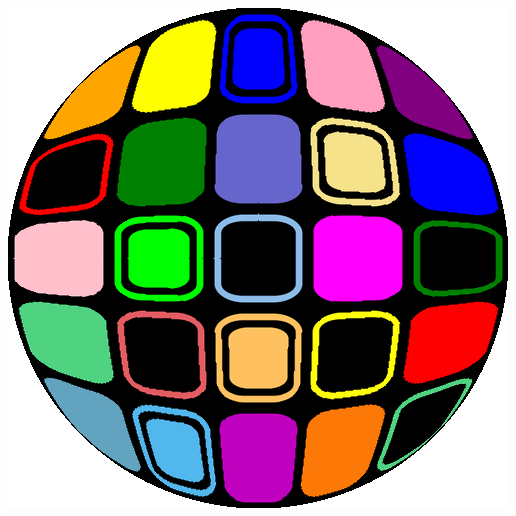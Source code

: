 \documentclass[11pt,class=report,crop=false]{standalone}
\begin{document}
\begin{center}
	\includegraphics[scale=\myscale,scale=0.25]{figures/image_carre_apres_2}		
\end{center}
\end{document}
